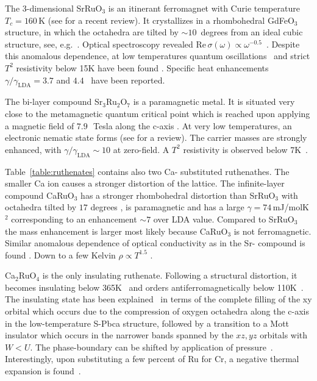 \documentclass[]{ar2e-changed}%
\begin{document}
The 3-dimensional SrRuO$_3$ is an itinerant ferromagnet with Curie
temperature $T_c=160$\,K (see \cite{koster_SrRuO3_rmp_2012} for a recent review). 
%
It crystallizes in a rhombohedral GdFeO$_3$
structure, in which the octahedra are tilted by $\sim 10$~degrees
from an ideal cubic structure, see, e.g.~\cite{zayak_prb_06}. 
%
Optical spectroscopy revealed $\mathrm{Re}\, \sigma(\omega) \propto
{\omega}^{-0.5}$~\cite{kostic_prl_1998,dodge_prl_2000}.  Despite this
anomalous dependence, at low temperatures quantum
oscillations~\cite{mackenzie_prb_1998} and strict $T^2$ resistivity
below 15K have been found \cite{capogna_prl_2002}. Specific heat
enhancements $\gamma/\gamma_\mathrm{LDA}=3.7$ \cite{allen_prb_96} and
$4.4$~\cite{okamoto_prb_99} have been reported.

The bi-layer compound Sr$_3$Ru$_2$O$_7$ is a paramagnetic metal.  It
is situated very close to the metamagnetic quantum critical point
which is reached upon applying a magnetic field of $7.9\,$~Tesla along the
c-axis \cite{grigera_science_2001}. At very low temperatures, an electronic 
nematic state forms (see \cite{fradkin_annrev_2010} for a review). 
%
The carrier masses are strongly enhanced, with $\gamma/\gamma_\mathrm{LDA} \sim 10$ at zero-field. 
A $T^2$ resistivity is observed below 7K~\cite{capogna_prl_2002}.

Table~\ref{table:ruthenates} contains also two Ca- substituted
ruthenathes.  The smaller Ca ion causes a stronger distortion of the
lattice. The infinite-layer compound CaRuO$_3$ has a stronger
rhombohedral distortion than SrRuO$_3$ with octahedra tilted by $17$
degrees \cite{zayak_prb_06}, is paramagnetic and has a large
$\gamma=74$\,mJ/molK$^2$ \cite{shepard_jap_1997} corresponding to an
enhancement $\sim 7$ over LDA value.  Compared to SrRuO$_3$ the mass
enhancement is larger most likely because CaRuO$_3$ is not
ferromagnetic.  Similar anomalous dependence of optical conductivity
as in the Sr- compound is found \cite{lee_prb_2001,lee_prb_2002}. Down
to a few Kelvin $\rho \propto T^{1.5}$ \cite{capogna_prl_2002}.

Ca$_2$RuO$_4$ is the only insulating ruthenate. Following a structural
distortion, it becomes insulating below 365K~\cite{alexander_prb_1999}
and orders antiferromagnetically below
110K~\cite{cao_prb_ca2ruo4_1997}.  The insulating state has been
explained~\cite{gorelov_ca2ruo4_prl_2010} in terms of the complete filling of the xy orbital which occurs
due to the compression of oxygen octahedra along the
c-axis in the low-temperature S-Pbca
structure, followed by a transition to a Mott insulator which occurs
in the narrower bands spanned by the $xz,yz$ orbitals with $W<U$.  The
phase-boundary can be shifted by application of
pressure~\cite{steffens_prb_2005}. Interestingly, upon substituting a 
few percent of Ru for Cr, a negative thermal expansion is
found~\cite{qi_prl_2010}. 
\end{document}
